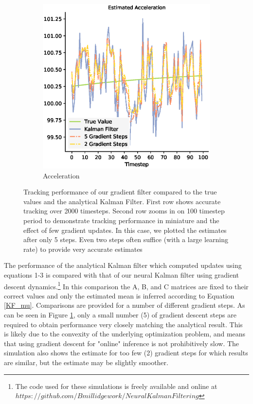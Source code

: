 \begin{figure}[H]
\begin{subfigure}{0.32\textwidth}
 \includegraphics[width=.8\linewidth]{chapter_3_figures/Estimated_Acceleration_NKF_zoomed.eps}
 \caption{Acceleration}
 \end{subfigure}
 \caption{Tracking performance of our gradient filter compared to the true values and the analytical Kalman Filter. First row shows accurate tracking over 2000 timesteps. Second row zooms in on 100 timestep period to demonstrate tracking performance in miniature and the effect of few gradient updates. In this case, we plotted the estimates after only 5 steps. Even two steps often suffice (with a large learning rate) to provide very accurate estimates}
 
\label{KF_tracking}
\end{figure}


The performance of the analytical Kalman filter which computed updates using equations 1-3 is compared with that of our neural Kalman filter using gradient descent dynamics.\footnote{The code used for these simulations is freely available and online at $https://github.com/Bmillidgework/NeuralKalmanFiltering$} In this comparison the A, B, and C matrices are fixed to their correct values and only the estimated mean is inferred according to Equation \ref{KF_mu}. Comparisons are provided for a number of different gradient steps. As can be seen in Figure \ref{KF_tracking}, only a small number (5) of gradient descent steps are required to obtain performance very closely matching the analytical result. This is likely due to the convexity of the underlying optimization problem, and means that using gradient descent for "online" inference is not prohibitively slow. The simulation also shows the estimate for too few (2) gradient steps for which results are similar, but the estimate may be slightly smoother.

